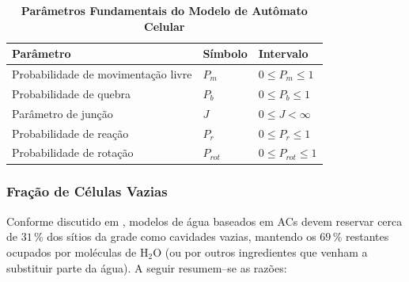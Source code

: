 \documentclass[12pt,oneside]{report}
\begin{document}
\begin{table}[H]
    \centering
    \caption{\textbf{Parâmetros Fundamentais do Modelo de Autômato Celular}}
    \vspace{0.2cm}
    \begin{tabularx}{\textwidth}{X m{3cm} m{3cm}}
        \hline
        \textbf{Parâmetro}                  & \textbf{Símbolo} & \textbf{Intervalo}      \\
        \hline
        Probabilidade de movimentação livre & $P_m$            & $0 \leq P_m \leq 1$     \\
        Probabilidade de quebra             & $P_b$            & $0 \leq P_b \leq 1$     \\
        Parâmetro de junção                 & $J$              & $0 \leq J < \infty$     \\
        Probabilidade de reação             & $P_r$            & $0 \leq P_r \leq 1$     \\
        Probabilidade de rotação            & $P_{rot}$        & $0 \leq P_{rot} \leq 1$ \\
        \hline
    \end{tabularx}

    \vspace{0.2cm}
\end{table}

\subsubsection{Fração de Células Vazias}
\label{subsubsec:fracao_celulas_vazias}

Conforme discutido em \citeauthor*{kier2005}, modelos de água baseados em ACs devem reservar cerca de $31\,\%$ dos sítios da grade como
cavidades vazias, mantendo os $69\,\%$ restantes ocupados por moléculas de
H$_2$O (ou por outros ingredientes que venham a substituir parte da água).
A seguir resumem--se as razões:
\end{document}
